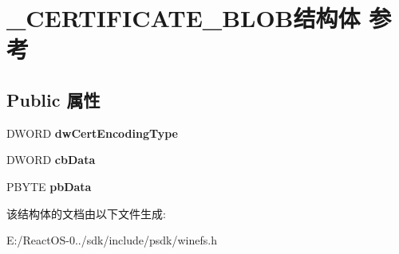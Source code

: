 \hypertarget{struct___c_e_r_t_i_f_i_c_a_t_e___b_l_o_b}{}\section{\+\_\+\+C\+E\+R\+T\+I\+F\+I\+C\+A\+T\+E\+\_\+\+B\+L\+O\+B结构体 参考}
\label{struct___c_e_r_t_i_f_i_c_a_t_e___b_l_o_b}
\subsection*{Public 属性}
\begin{DoxyCompactItemize}
\item 
\mbox{\label{struct___c_e_r_t_i_f_i_c_a_t_e___b_l_o_b_ac91ad981d0d2ca57fbf6ff19bfe912ae}} 
D\+W\+O\+RD {\bfseries dw\+Cert\+Encoding\+Type}
\item 
\mbox{\label{struct___c_e_r_t_i_f_i_c_a_t_e___b_l_o_b_a8fe7ad45a68a4934c2e70394da870818}} 
D\+W\+O\+RD {\bfseries cb\+Data}
\item 
\mbox{\label{struct___c_e_r_t_i_f_i_c_a_t_e___b_l_o_b_af0c0279adf4afd436dfad57800efc25a}} 
P\+B\+Y\+TE {\bfseries pb\+Data}
\end{DoxyCompactItemize}


该结构体的文档由以下文件生成\+:\begin{DoxyCompactItemize}
\item 
E\+:/\+React\+O\+S-\/0../sdk/include/psdk/winefs.\+h\end{DoxyCompactItemize}
